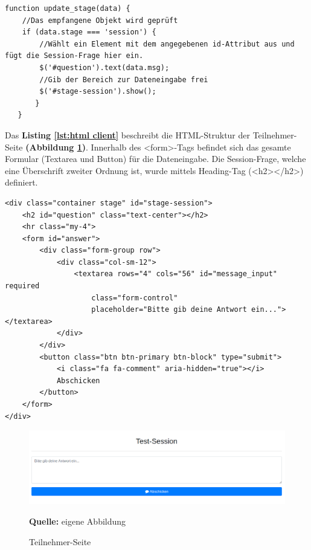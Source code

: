 \begin{lstlisting}[caption={Stellt die Eingabefunktion auf der Teilnehmer-Seite bereit - JavaScript}, label=lst:update-stage, captionpos=b]
function update_stage(data) {
	//Das empfangene Objekt wird geprüft
	if (data.stage === 'session') {
		//Wählt ein Element mit dem angegebenen id-Attribut aus und fügt die Session-Frage hier ein.
		$('#question').text(data.msg);
		//Gib der Bereich zur Dateneingabe frei
		$('#stage-session').show();
       }
   }
\end{lstlisting}

Das \textbf{Listing \ref{lst:html client}} beschreibt die HTML-Struktur der Teilnehmer-Seite \textbf{(Abbildung \ref{fig:teilnehmer-Seite final})}. Innerhalb des <form>-Tags befindet sich das gesamte Formular (Textarea und Button) für die Dateneingabe. Die Session-Frage, welche eine Überschrift zweiter Ordnung ist, wurde mittels Heading-Tag (<h2></h2>) definiert.\bigskip

\begin{lstlisting}[caption={HTML-Struktur der Teilnehmer-Seite}, label=lst:html client, captionpos=b]
<div class="container stage" id="stage-session">
    <h2 id="question" class="text-center"></h2>
    <hr class="my-4">
    <form id="answer">
        <div class="form-group row">
            <div class="col-sm-12">
                <textarea rows="4" cols="56" id="message_input" required
                    class="form-control"
                    placeholder="Bitte gib deine Antwort ein..."></textarea>
            </div>
        </div>
        <button class="btn btn-primary btn-block" type="submit">
            <i class="fa fa-comment" aria-hidden="true"></i>
            Abschicken
        </button>
    </form>
</div>
\end{lstlisting}

\begin{figure}[H]
  \begin{center}
    \includegraphics[scale=0.35]{img/client}
	\caption{Teilnehmer-Seite} 
	\footnotesize\sffamily\textbf{Quelle:} eigene Abbildung
	\label{fig:teilnehmer-Seite final}
  \end{center}   
\end{figure}

